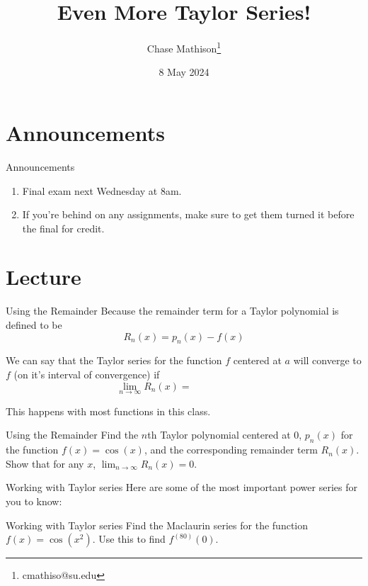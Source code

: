 \documentclass[presentation]{beamer}
\institute[SU]{Shenandoah University}
\author{Chase Mathison\thanks{cmathiso@su.edu}}
\date{8 May 2024}
\title{Even More Taylor Series!}
\begin{document}
\maketitle

\section{Announcements}
\label{sec:orga103bd9}
\begin{frame}[label={sec:org3c44db7}]{Announcements}
\begin{enumerate}
\item Final exam next Wednesday at 8am.
\item If you're behind on any assignments, make sure to get them turned
it before the final for credit.
\end{enumerate}
\end{frame}

\section{Lecture}
\label{sec:org124f4f1}
\begin{frame}[label={sec:org581a3b0}]{Using the Remainder}
Because the remainder term for a Taylor polynomial is \alert{defined} to be
\[
R_n(x) = p_n(x) - f(x)\]

We can say that the Taylor series for the function \(f\) centered at \(a\)
will converge to \(f\) (on it's interval of convergence) if
\[
\lim_{n\rightarrow \infty} R_n(x) = \hspace{1in}\]

This happens with most functions in this class.
\end{frame}

\begin{frame}[label={sec:orgb183126}]{Using the Remainder}
Find the \(n\)th Taylor polynomial centered at \(0\), \(p_{n}(x)\) for
the function \(f(x) = \cos(x)\), and the corresponding remainder term \(R_n(x).\)
Show that for any \(x\), \(\lim_{n\rightarrow \infty}R_n(x) = 0.\)
\vspace{10in}
\end{frame}

\begin{frame}[label={sec:org5d98faf}]{Working with Taylor series}
Here are some of the most important power series for you to know:
\vspace{10in}
\end{frame}

\begin{frame}[label={sec:orgae6f2cc}]{Working with Taylor series}
Find the Maclaurin series for the function \(f(x) = \cos(x^2).\) Use this to find
\(f^{(80)}(0).\)
\vspace{10in}
\end{frame}
\end{document}
